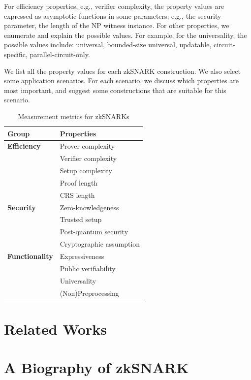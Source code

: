 \documentclass[acmtog]{acmart}
\begin{document}
For efficiency properties, e.g., verifier complexity, the property values are expressed as asymptotic functions in some parameters, e.g., the security parameter, the length of the NP witness instance.
For other properties, we enumerate and explain the possible values.
For example, for the universality, the possible values include: universal, bounded-size universal, updatable, circuit-specific, parallel-circuit-only.

We list all the property values for each zkSNARK construction.
We also select some application scenarios.
For each scenario, we discuss which properties are most important, and suggest some constructions that are suitable for this scenario.

\begin{table}[tb]
	\caption{Measurement metrics for zkSNARKs}
	\label{tab:measure}
	\centering

	\begin{tabular}{ll}
	\hline

	\hline
	\textbf{Group} & \textbf{Properties} \\
	\hline
	\textbf{Efficiency} & Prover complexity \\
	& Verifier complexity \\
	& Setup complexity \\
	& Proof length \\
	& CRS length \\ \hline
	\textbf{Security} & Zero-knowledgeness \\
	& Trusted setup \\
	& Post-quantum security \\
	& Cryptographic assumption \\ \hline
	\textbf{Functionality} & Expressiveness \\
	& Public verifiability \\
	& Universality \\
	& (Non)Preprocessing \\
	\hline

	\hline
	\end{tabular}
\end{table}


\section{Related Works}

\section{A Biography of zkSNARK}
\label{sec:history}
\end{document}
